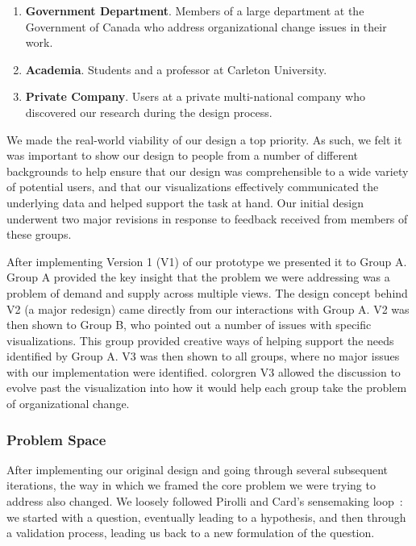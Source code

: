 \documentclass[journal]{vgtc}                %
\begin{document}
\begin{enumerate}[label=(\Alph*)]
\item  \textbf{Government Department}. Members of a large department at the Government of Canada who address organizational change issues in their work.
\item \textbf{Academia}. Students and a professor at Carleton University.
\item \textbf{Private Company}. Users at a private multi-national company who discovered our research during the design process.
\end{enumerate}

We made the real-world viability of our design a top priority. As such, we felt it was important to show our design to people from a number of different backgrounds to help ensure that our design was comprehensible to a wide variety of potential users, and that our visualizations effectively communicated the underlying data and helped support the task at hand. Our initial design underwent two major revisions in response to feedback received from members of these groups. 

After implementing Version 1 (V1) of our prototype we presented it to Group A. Group A provided the key insight that the problem we were addressing was a problem of demand and supply across multiple views. The design concept behind V2 (a major redesign) came directly from our interactions with Group A. V2 was then shown to Group B, who pointed out a number of issues with specific visualizations.  This group provided creative ways of helping support the needs identified by Group A. V3 was then shown to all groups, where no major issues with our implementation were identified.  {color{gren} V3 allowed the discussion to evolve past the visualization into how it would help each group take the problem of organizational change.}

\subsubsection{Problem Space}
\label{sec:problem}
After implementing our original design and going through several subsequent iterations, the way in which we framed the core problem we were trying to address also changed. We loosely followed Pirolli and Card's sensemaking loop~\cite{pirolli2005sensemaking}: we started with a question, eventually leading to a hypothesis, and then through a validation process, leading us back to a new formulation of the question.  
\end{document}

